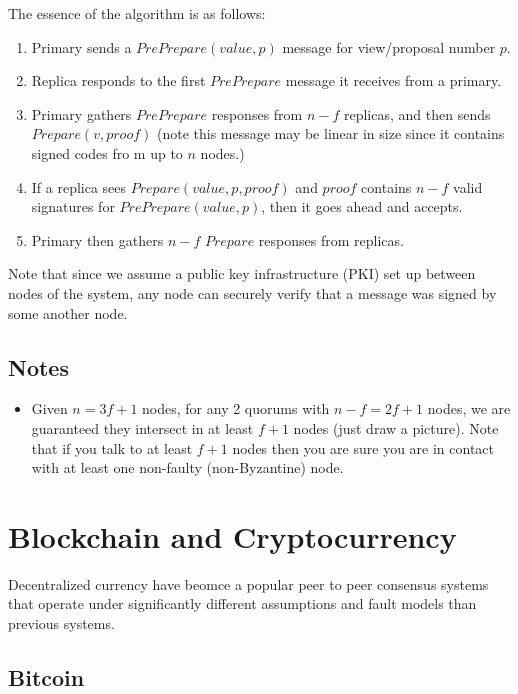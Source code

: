 \documentclass[10pt,a4paper]{article}
\begin{document}

The essence of the algorithm is as follows:
\begin{enumerate}
    \item Primary sends a $PrePrepare(value, p)$ message for view/proposal number $p$.
    \item Replica responds to the first $PrePrepare$ message it receives from a primary.
    \item Primary gathers $PrePrepare$ responses from $n-f$ replicas, and then sends $Prepare(v, proof)$ (note this message may be linear in size since it contains signed codes fro   m up to $n$ nodes.)
    \item If a replica sees $Prepare(value, p, proof)$ and $proof$ contains $n-f$ valid signatures for $PrePrepare(value, p)$, then it goes ahead and accepts.
    \item Primary then gathers $n-f$ $Prepare$ responses from replicas.
\end{enumerate}
Note that since we assume a public key infrastructure (PKI) set up between nodes of the system, any node can securely verify that a message was signed by some another node.

\subsection{Notes}
\begin{itemize}
    \item Given $n=3f+1$ nodes, for any 2 quorums with $n-f = 2f+1$ nodes, we are guaranteed they intersect in at least $f+1$ nodes (just draw a picture). Note that if you talk to at least $f+1$ nodes then you are sure you are in contact with at least one non-faulty (non-Byzantine) node.
\end{itemize}

\section{Blockchain and Cryptocurrency}

Decentralized currency have beomce a popular peer to peer consensus systems that operate under significantly different assumptions and fault models than previous systems.

\subsection{Bitcoin}
\end{document}
